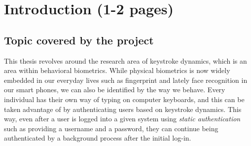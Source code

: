 \documentclass[informationsecurity]{gucmasterproject}
\begin{document}
%
%

\chapter{Introduction (1-2 pages)}

\section{Topic covered by the project}
\label{sec:topic}
This thesis revolves around the research area of keystroke dynamics, which is an area within behavioral biometrics.
While physical biometrics is now widely embedded in our everyday lives such as fingerprint and lately face recognition in our smart phones, we can also be identified by the way we behave.
Every individual has their own way of typing on computer keyboards, and this can be taken advantage of by authenticating users based on keystroke dynamics.
This way, even after a user is logged into a given system using \textit{static authentication} such as providing a username and a password, they can continue being authenticated by a background process after the initial log-in.
\end{document}
